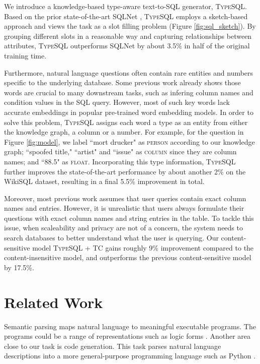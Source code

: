 \documentclass[11pt,a4paper]{article}
\begin{document}
We introduce a knowledge-based type-aware text-to-SQL generator, \textsc{TypeSQL}. Based on the prior state-of-the-art SQLNet \cite{Xu2017}, \textsc{TypeSQL} employs a sketch-based approach and views the task as a slot filling problem (Figure \ref{fig:sql_sketch}). By grouping different slots in a reasonable way and capturing relationships between attributes, \textsc{TypeSQL} outperforms SQLNet by about 3.5\% in half of the original training time.

Furthermore, natural language questions often contain rare entities and numbers specific to the underlying database. Some previous work \cite{agrawal03} already shows those words are crucial to many downstream tasks, such as infering column names and condition values in the SQL query. However, most of such key words lack accurate embeddings in popular pre-trained word embedding models. In order to solve this problem, \textsc{TypeSQL} assigns each word a type as an entity from either the knowledge graph, a column or a number. For example, for the question in Figure \ref{fig:model}, we label ``mort drucker" as \textsc{person} according to our knowledge graph; ``spoofed title," ``artist" and ``issue" as \textsc{column} since they are column names; and ``88.5" as \textsc{float}. Incorporating this type information, \textsc{TypeSQL} further improves the state-of-the-art performance by about another 2\% on the WikiSQL dataset, resulting in a final 5.5\% improvement in total. 

Moreover, most previous work assumes that user queries contain exact column names and entries. However, it is unrealistic that users always formulate their questions with exact column names and string entries in the table. To tackle this issue, when scaleability and privacy are not of a concern, the system needs to search databases to better understand what the user is querying.
Our content-sensitive model \textsc{TypeSQL + TC} gains roughly 9\% improvement compared to the content-insensitive model, and outperforms the previous content-sensitive model by 17.5\%.


\section{Related Work}
\label{sec:rel}

Semantic parsing maps natural language to meaningful executable programs. The programs could be a range of representations such as logic forms \cite{zelle96,Zettlemoyer05,wong07,Das10,Liang11,banarescu13,artzi13,Reddy14,Berant14,pasupat2015compositional}. Another area close to our task is code generation. This task parses natural language descriptions into a more general-purpose programming language such as Python \cite{Allamanis15,ling16, RabinovichSK17,Yin17}.
\end{document}
